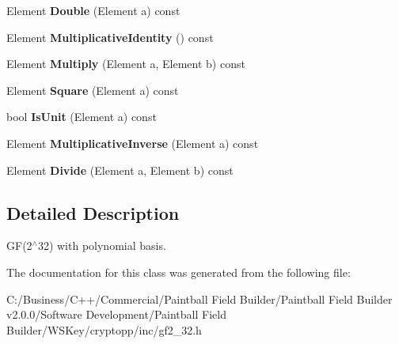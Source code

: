 \begin{DoxyCompactItemize}
\item 
\hypertarget{class_g_f2__32_a54e7fe1c5d397e095b805501d46677de}{
Element {\bfseries Double} (Element a) const }
\label{class_g_f2__32_a54e7fe1c5d397e095b805501d46677de}

\item 
\hypertarget{class_g_f2__32_af5f563ec52278dc61f714e35ff25aa76}{
Element {\bfseries MultiplicativeIdentity} () const }
\label{class_g_f2__32_af5f563ec52278dc61f714e35ff25aa76}

\item 
\hypertarget{class_g_f2__32_a275c155f33a85309ecbf12c2eeb2430b}{
Element {\bfseries Multiply} (Element a, Element b) const }
\label{class_g_f2__32_a275c155f33a85309ecbf12c2eeb2430b}

\item 
\hypertarget{class_g_f2__32_a73dd7155eb04918149a288ace7b9a812}{
Element {\bfseries Square} (Element a) const }
\label{class_g_f2__32_a73dd7155eb04918149a288ace7b9a812}

\item 
\hypertarget{class_g_f2__32_a1868ab3fd6c57abb405edefa5320aabc}{
bool {\bfseries IsUnit} (Element a) const }
\label{class_g_f2__32_a1868ab3fd6c57abb405edefa5320aabc}

\item 
\hypertarget{class_g_f2__32_a8203503a437117e45f0ced345233dc38}{
Element {\bfseries MultiplicativeInverse} (Element a) const }
\label{class_g_f2__32_a8203503a437117e45f0ced345233dc38}

\item 
\hypertarget{class_g_f2__32_a475f08e7c0faa99e2c5b9c0dac05ff38}{
Element {\bfseries Divide} (Element a, Element b) const }
\label{class_g_f2__32_a475f08e7c0faa99e2c5b9c0dac05ff38}

\end{DoxyCompactItemize}


\subsection{Detailed Description}
GF(2$^\wedge$32) with polynomial basis. 

The documentation for this class was generated from the following file:\begin{DoxyCompactItemize}
\item 
C:/Business/C++/Commercial/Paintball Field Builder/Paintball Field Builder v2.0.0/Software Development/Paintball Field Builder/WSKey/cryptopp/inc/gf2\_\-32.h\end{DoxyCompactItemize}
